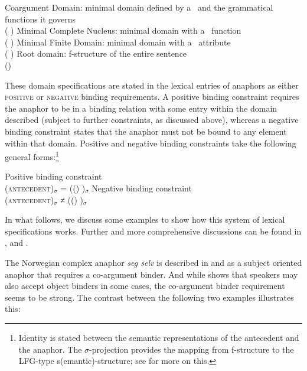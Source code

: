 \documentclass[output=paper,hidelinks]{langscibook}
\begin{document}
\ea\label{ex:Anaphora:30}
\ea\label{ex:Anaphora:30a} Coargument Domain:
 minimal domain defined by a \PRED\ and the grammatical   functions it governs\\[1ex]
 (\offp{\GF*}{$\neg$(\RIGHT\PRED)}  \GFPRO\UP)
\ex\label{ex:Anaphora:30b} Minimal Complete Nucleus: 
 minimal domain with a \SUBJ\ function\\[1ex]
 (\offp{\GF*}{$\neg$(\RIGHT \SUBJ)} \GFPRO\UP)
\ex\label{ex:Anaphora:30c} Minimal Finite Domain: 
 minimal domain with a \TENSE\ attribute\\[1ex]
 (\offp{\GF*}{$\neg$(\RIGHT\TENSE)}  \GFPRO\UP)
\ex\label{ex:Anaphora:30d} Root domain: 
 f-structure of the entire sentence\\[1ex]
 (\GF* \GFPRO\UP)
\z\z

\noindent These domain specifications are stated in the lexical entries of anaphors as either \textsc{positive} or \textsc{negative} binding requirements. A positive binding constraint requires the anaphor to be in a binding relation with some entry within the domain described (subject to further constraints, as discussed above), whereas a negative binding constraint states that the anaphor must not be bound to any element within that domain. Positive and negative binding constraints take the following general forms:\footnote{Identity is stated between the semantic representations of the antecedent and the anaphor. The $\sigma$-projection provides the mapping from f-structure to the LFG-type s(emantic)-structure; see  for more on this.}

\ea\label{ex:Anaphora:31}
\ea Positive binding constraint\\[1ex]
(\UP\textsc{antecedent})$_\sigma$ = ((\GF* \GFPRO\UP)  \GFANT )$_\sigma$
\ex Negative binding constraint\\[1ex]
(\UP\textsc{antecedent})$_\sigma$ ≠ ((\GF* \GFPRO\UP)  \GFANT )$_\sigma$
\z\z

\noindent In what follows, we discuss some examples to show how this system of lexical specifications works. Further and more comprehensive discussions can be found in \citet{dalrymple1993}, \citet{DLM:LFG} and \citet{bresnan2001lexical}.

The Norwegian complex anaphor \emph{seg selv} is described in \citet{Hellan88} and \citet{dalrymple1993} as a subject oriented anaphor that requires a co-argument binder. And while  shows that speakers may also accept object binders in some cases, the co-argument binder requirement seems to be strong. The contrast between the following two examples illustrates this:
\end{document}
